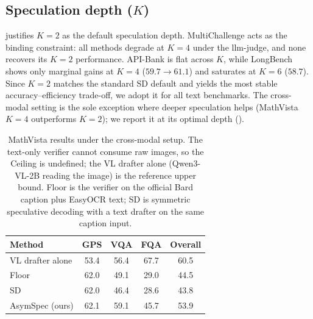 \documentclass[11pt]{article}
\theoremstyle{plain}
\theoremstyle{definition}
\begin{document}
\subsection{Speculation depth ($K$)}
\label{sec:ablation-K}
 justifies $K{=}2$ as the default speculation depth. MultiChallenge acts as the binding constraint: all methods degrade at $K{=}4$ under the llm-judge, and none recovers its $K{=}2$ performance. API-Bank is flat across $K$, while LongBench shows only marginal gains at $K{=}4$ ($59.7\!\to\!61.1$) and saturates at $K{=}6$ ($58.7$). Since $K{=}2$ matches the standard SD default and yields the most stable accuracy--efficiency trade-off, we adopt it for all text benchmarks. The cross-modal setting is the sole exception where deeper speculation helps (MathVista $K{=}4$ outperforms $K{=}2$); we report it at its optimal depth ().

\begin{table}[h!]
\centering
\small
\setlength{\tabcolsep}{5pt}
\begin{tabular}{lcccc}
\toprule
Method & GPS & VQA & FQA & Overall \\
\midrule
VL drafter alone     & 53.4 & 56.4 & 67.7 & 60.5 \\
Floor                & 62.0 & 49.1 & 29.0 & 44.5 \\
SD                         & 62.0 & 46.4 & 28.6 & 43.8 \\
AsymSpec (ours)            & 62.1 & 59.1 & 45.7 & 53.9 \\
\bottomrule
\end{tabular}
\caption{MathVista results under the cross-modal setup. The text-only verifier cannot consume raw images, so the Ceiling is undefined; the VL drafter alone (Qwen3-VL-2B reading the image) is the reference upper bound. Floor is the verifier on the official Bard caption plus EasyOCR text; SD is symmetric speculative decoding with a text drafter on the same caption input.}
\label{tab:mv}
\end{table}
\end{document}
